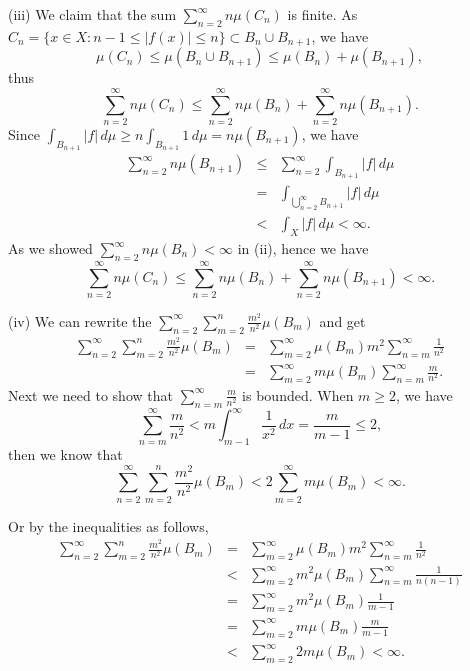 \documentclass[12pt,a4paper]{ctexart}
\begin{document}
(iii) We claim that the sum $\sum_{n=2}^{\infty} n \mu(C_{n})$ is finite. As $C_{n} = \{x \in X : n-1 \leq |f(x)| \leq n \} \subset B_{n} \cup B_{n+1}$, we have
\begin{equation*}
    \mu(C_{n}) \leq \mu(B_{n} \cup B_{n+1}) \leq \mu(B_{n}) + \mu(B_{n+1}),
\end{equation*}
thus
\begin{equation*}
    \sum_{n=2}^{\infty} n \mu(C_{n}) \leq \sum_{n=2}^{\infty} n \mu(B_{n}) +  \sum_{n=2}^{\infty} n \mu (B_{n+1}).
\end{equation*}
Since $\int_{B_{n+1}}^{} |f| \, d \mu  \geq n \int_{B_{n+1}}^{} 1 \, d \mu = n \mu(B_{n+1})$, we have
\begin{eqnarray*}
    \sum_{n=2}^{\infty} n \mu(B_{n+1}) & \leq & \sum_{n=2}^{\infty} \int_{B_{n+1}}^{} |f| \, d \mu \\
    & = & \int_{\bigcup_{n=2}^{\infty} B_{n+1}}^{} |f| \, d \mu \\
    & < & \int_{X}^{} |f| \, d \mu < \infty.
\end{eqnarray*}
As we showed $\sum_{n=2}^{\infty} n \mu(B_{n}) < \infty$ in (ii), hence we have
\begin{equation*}
    \sum_{n=2}^{\infty} n \mu(C_{n}) \leq \sum_{n=2}^{\infty} n \mu(B_{n}) +  \sum_{n=2}^{\infty} n \mu (B_{n+1}) < \infty.
\end{equation*}

(iv) We can rewrite the $\sum_{n=2}^{\infty} \sum_{m=2}^{n} \frac{m^{2}}{n^{2}} \mu(B_{m}) $ and get
\begin{eqnarray*}
    \sum_{n=2}^{\infty} \sum_{m=2}^{n} \frac{m^{2}}{n^{2}} \mu(B_{m}) & = & \sum_{m=2}^{\infty} \mu(B_{m}) m^{2} \sum_{n=m}^{\infty} \frac{1}{n^{2}}  \\
    & = & \sum_{m=2}^{\infty} m \mu(B_{m}) \sum_{n=m}^{\infty} \frac{m}{n^{2}}.
\end{eqnarray*}
Next we need to show that $\sum_{n=m}^{\infty} \frac{m}{n^{2}}$ is bounded. When $m \geq 2$, we have
\begin{equation*}
    \sum_{n=m}^{\infty} \frac{m}{n^{2}} < m \int_{m-1}^{\infty} \frac{1}{x^{2}} \, d x = \frac{m}{m-1} \leq 2,
\end{equation*}
then we know that
\begin{equation*}
    \sum_{n=2}^{\infty} \sum_{m=2}^{n} \frac{m^{2}}{n^{2}} \mu(B_{m}) < 2 \sum_{m=2}^{\infty} m \mu(B_{m}) < \infty.
\end{equation*}

Or by the inequalities as follows,
\begin{eqnarray*}
    \sum_{n=2}^{\infty} \sum_{m=2}^{n} \frac{m^{2}}{n^{2}} \mu(B_{m}) & = & \sum_{m=2}^{\infty} \mu(B_{m}) m^{2} \sum_{n=m}^{\infty} \frac{1}{n^{2}}  \\
    & < & \sum_{m=2}^{\infty} m^2 \mu(B_{m}) \sum_{n=m}^{\infty} \frac{1}{n(n-1)} \\
    & = & \sum_{m=2}^{\infty} m^2 \mu(B_{m}) \frac{1}{m-1} \\
    & = & \sum_{m=2}^{\infty} m \mu(B_{m}) \frac{m}{m-1} \\
    & < & \sum_{m=2}^{\infty} 2 m \mu(B_{m}) < \infty.
\end{eqnarray*}
\end{document}
